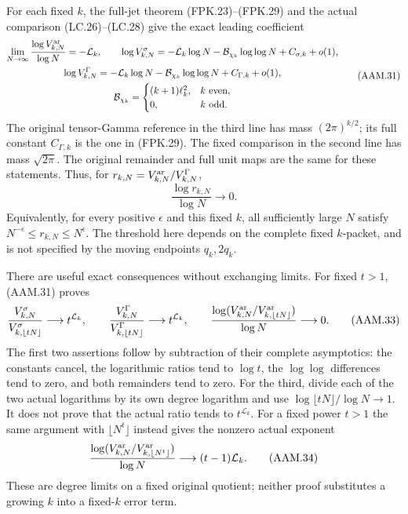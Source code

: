 For each fixed $k$, the full-jet theorem (FPK.23)--(FPK.29) and
the actual comparison (LC.26)--(LC.28) give the exact leading
coefficient
\[
 \begin{gathered}
 \lim_{N\to\infty}\frac{\log V_{k,N}^{\rm ar}}{\log N}
       =-\mathcal L_k,\qquad
 \log V_{k,N}^\sigma=-\mathcal L_k\log N
                      -\mathcal B_{\chi_k}\log\log N+C_{\sigma,k}+o(1),\\
 \log V_{k,N}^{\Gamma}=-\mathcal L_k\log N
                      -\mathcal B_{\chi_k}\log\log N+C_{\Gamma,k}+o(1),\\
 \mathcal B_{\chi_k}=
 \begin{cases}(k+1)\ell_k^2,&k\text{ even},\\0,&k\text{ odd}.
 \end{cases}
 \end{gathered}
 \tag{AAM.31}
\]
The original tensor-Gamma reference in the third line has mass
$(2\pi)^{k/2}$; its full constant $C_{\Gamma,k}$ is the one in
(FPK.29). The fixed comparison in the second line has mass
$\sqrt{2\pi}$. The original remainder and full unit maps are the
same for these statements. Thus, for $r_{k,N}=V_{k,N}^{\rm ar}/
V_{k,N}^{\Gamma}$,
\[
 \frac{\log r_{k,N}}{\log N}\longrightarrow0.
 \tag{AAM.32}
\]
Equivalently, for every positive $\epsilon$ and this fixed $k$, all
sufficiently large $N$ satisfy $N^{-\epsilon}\leq r_{k,N}\leq
N^\epsilon$. The threshold here depends on the complete fixed
$k$-packet, and is not specified by the moving endpoints $q_k,2q_k$.

There are useful exact consequences without exchanging limits.
For fixed $t>1$, (AAM.31) proves
\[
 \frac{V_{k,N}^\sigma}{V_{k,\lfloor tN\rfloor}^\sigma}
       \longrightarrow t^{\mathcal L_k},\qquad
 \frac{V_{k,N}^{\Gamma}}{V_{k,\lfloor tN\rfloor}^{\Gamma}}
       \longrightarrow t^{\mathcal L_k},\qquad
 \frac{\log(V_{k,N}^{\rm ar}/V_{k,\lfloor tN\rfloor}^{\rm ar})}
          {\log N}\longrightarrow0.
 \tag{AAM.33}
\]
The first two assertions follow by subtraction of their complete
asymptotics: the constants cancel, the logarithmic ratios tend to
$\log t$, the $\log\log$ differences tend to zero, and both
remainders tend to zero. For the third, divide each of the two
actual logarithms by its own degree logarithm and use
$\log\lfloor tN\rfloor/\log N\to1$. It does not prove that
the actual ratio tends to $t^{\mathcal L_k}$.
For a fixed power $t>1$ the same argument with $\lfloor N^t\rfloor$
instead gives the nonzero actual exponent
\[
 \frac{\log(V_{k,N}^{\rm ar}/V_{k,\lfloor N^t\rfloor}^{\rm ar})}
          {\log N}\longrightarrow(t-1)\mathcal L_k.
 \tag{AAM.34}
\]
These are degree limits on a fixed original quotient; neither proof
substitutes a growing $k$ into a fixed-$k$ error term.

